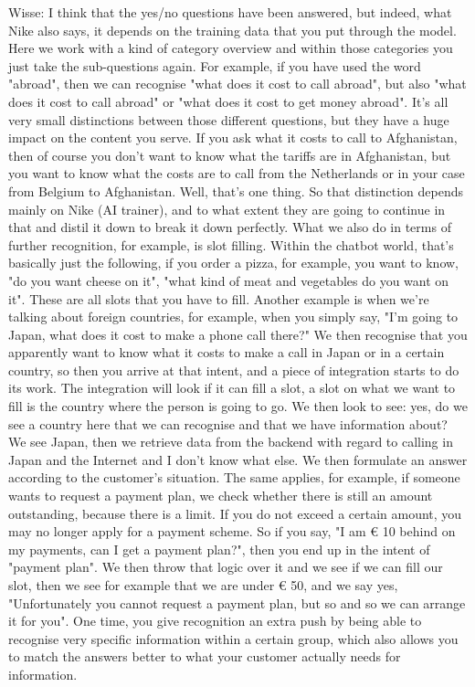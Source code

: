 \begin{appendices}
	Wisse: I think that the yes/no questions have been answered, but indeed, what Nike also says, it depends on the training data that you put through the model. Here we work with a kind of category overview and within those categories you just take the sub-questions again. For example, if you have used the word "abroad", then we can recognise "what does it cost to call abroad", but also "what does it cost to call abroad" or "what does it cost to get money abroad". It's all very small distinctions between those different questions, but they have a huge impact on the content you serve. If you ask what it costs to call to Afghanistan, then of course you don't want to know what the tariffs are in Afghanistan, but you want to know what the costs are to call from the Netherlands or in your case from Belgium to Afghanistan. Well, that's one thing. So that distinction depends mainly on Nike (AI trainer), and to what extent they are going to continue in that and distil it down to break it down perfectly. What we also do in terms of further recognition, for example, is slot filling. Within the chatbot world, that's basically just the following, if you order a pizza, for example, you want to know, "do you want cheese on it", "what kind of meat and vegetables do you want on it". These are all slots that you have to fill. Another example is when we're talking about foreign countries, for example, when you simply say, "I'm going to Japan, what does it cost to make a phone call there?"  We then recognise that you apparently want to know what it costs to make a call in Japan or in a certain country, so then you arrive at that intent, and a piece of integration starts to do its work. The integration will look if it can fill a slot, a slot on what we want to fill is the country where the person is going to go. We then look to see: yes, do we see a country here that we can recognise and that we have information about? We see Japan, then we retrieve data from the backend with regard to calling in Japan and the Internet and I don't know what else. We then formulate an answer according to the customer's situation. The same applies, for example, if someone wants to request a payment plan, we check whether there is still an amount outstanding, because there is a limit. If you do not exceed a certain amount, you may no longer apply for a payment scheme. So if you say, "I am € 10 behind on my payments, can I get a payment plan?", then you end up in the intent of "payment plan". We then throw that logic over it and we see if we can fill our slot, then we see for example that we are under € 50, and we say yes, "Unfortunately you cannot request a payment plan, but so and so we can arrange it for you". One time, you give recognition an extra push by being able to recognise very specific information within a certain group, which also allows you to match the answers better to what your customer actually needs for information.\\

\end{appendices}
